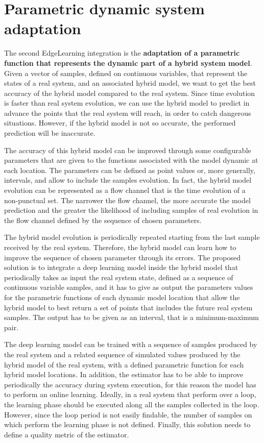 \section{Parametric dynamic system adaptation}

The second EdgeLearning integration is the \textbf{adaptation of a parametric function that represents the dynamic part of a hybrid system model}. Given a vector of samples, defined on continuous variables, that represent the states of a real system, and an associated hybrid model, we want to get the best accuracy of the hybrid model compared to the real system. Since time evolution is faster than real system evolution, we can use the hybrid model to predict in advance the points that the real system will reach, in order to catch dangerous situations. However, if the hybrid model is not so accurate, the performed prediction will be inaccurate. 

The accuracy of this hybrid model can be improved through some configurable parameters that are given to the functions associated with the model dynamic at each location. The parameters can be defined as point values or, more generally, intervals, and allow to include the samples evolution. In fact, the hybrid model evolution can be represented as a flow channel that is the time evolution of a non-punctual set. The narrower the flow channel, the more accurate the model prediction and the greater the likelihood of including samples of real evolution in the flow channel defined by the sequence of chosen parameters.

The hybrid model evolution is periodically repeated starting from the last sample received by the real system. Therefore, the hybrid model can learn how to improve the sequence of chosen parameter through its errors. The proposed solution is to integrate a deep learning model inside the hybrid model that periodically takes as input the real system state, defined as a sequence of continuous variable samples, and it has to give as output the parameters values for the parametric functions of each dynamic model location that allow the hybrid model to best return a set of points that includes the future real system samples. The output has to be given as an interval, that is a minimum-maximum pair. 

The deep learning model can be trained with a sequence of samples produced by the real system and a related sequence of simulated values produced by the hybrid model of the real system, with a defined parametric function for each hybrid model locations. In addition, the estimator has to be able to improve periodically the accuracy during system execution, for this reason the model has to perform an online learning. Ideally, in a real system that perform over a loop, the learning phase should be executed along all the samples collected in the loop. However, since the loop period is not easily findable, the number of samples on which perform the learning phase is not defined. Finally, this solution needs to define a quality metric of the estimator.

